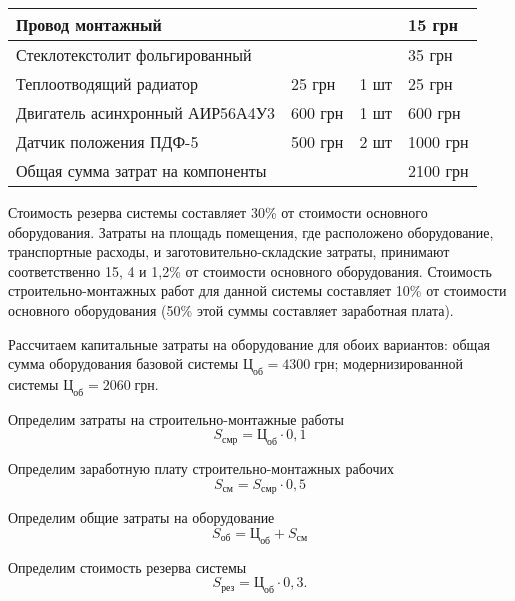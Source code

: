 \begin{longtable}{|p{8cm}|p{}|p{}|p{}|}
        \hline
        Провод монтажный & & & 15 грн\\
        \hline
        Стеклотекстолит фольгированный & & & 35 грн\\
        \hline
        Теплоотводящий радиатор  & 25 грн & 1 шт & 25 грн\\
        \hline
        Двигатель асинхронный АИР56А4У3 & 600 грн & 1 шт & 600 грн\\
        \hline
        Датчик положения ПДФ-5 & 500 грн & 2 шт & 1000 грн\\
        \hline
        \multicolumn{3}{|l|}{Общая сумма затрат на компоненты} & 2100 грн\\
        \hline
        \end{longtable}

        Стоимость резерва системы составляет 30\% от стоимости основного
        оборудования. Затраты на площадь помещения, где расположено
        оборудование, транспортные расходы, и заготовительно-складские затраты,
        принимают соответственно 15, 4 и 1,2\% от стоимости основного
        оборудования. Стоимость строительно-монтажных работ для данной системы
        составляет 10\% от стоимости основного оборудования (50\% этой суммы
        составляет заработная плата).

        Рассчитаем капитальные затраты на оборудование для обоих вариантов:
        общая сумма оборудования базовой системы $Ц_{об} = 4300 \; \text{грн}$;
        модернизированной системы $Ц_{об} = 2060 \; \text{грн}$.

        Определим затраты на строительно-монтажные работы
        \begin{equation}
            S_\text{смр} = \text{Ц}_\text{об} \cdot 0,1
        \end{equation}

        Определим заработную плату строительно-монтажных рабочих
        \begin{equation}
            S_\text{см} = S_\text{смр} \cdot 0,5
        \end{equation}

        Определим общие затраты на оборудование
        \begin{equation}
            S_\text{об} = \text{Ц}_\text{об} + S_\text{см} 
        \end{equation}

        Определим стоимость резерва системы
        \begin{equation}
            S_\text{рез} = \text{Ц}_\text{об} \cdot 0,3.
        \end{equation}

